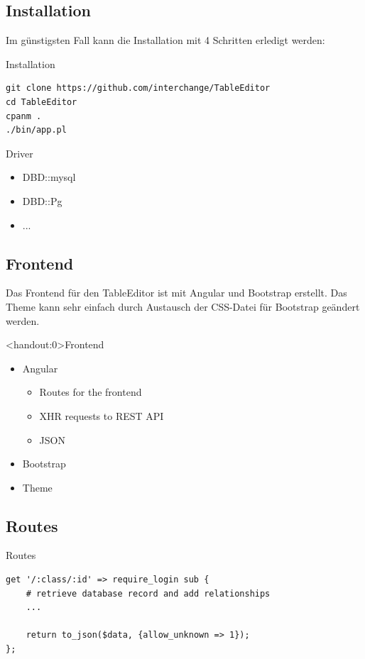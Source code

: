\subsection{Installation}
Im günstigsten Fall kann die Installation mit 4 Schritten
erledigt werden:

\begin{frame}[fragile]{Installation}
\begin{lstlisting}
git clone https://github.com/interchange/TableEditor
cd TableEditor
cpanm .
./bin/app.pl
\end{lstlisting}
\end{frame}

\begin{frame}[fragile]{Driver}
\begin{itemize}
\item DBD::mysql
\item DBD::Pg
\item ...
\end{itemize}
\end{frame}

\subsection{Frontend}
Das Frontend für den TableEditor ist mit Angular und Bootstrap erstellt.
Das Theme kann sehr einfach durch Austausch der CSS-Datei für Bootstrap
geändert werden.

\begin{frame}<handout:0>{Frontend}
\begin{itemize}
\item Angular
\begin{itemize}
\item Routes for the frontend
\item XHR requests to REST API
\item JSON
\end{itemize}
\item Bootstrap
\item Theme
\end{itemize}
\end{frame}

\subsection{Routes}
\begin{frame}[fragile]{Routes}
\begin{lstlisting}
get '/:class/:id' => require_login sub {
    # retrieve database record and add relationships
    ...

    return to_json($data, {allow_unknown => 1});
};
\end{lstlisting}
\end{frame}

